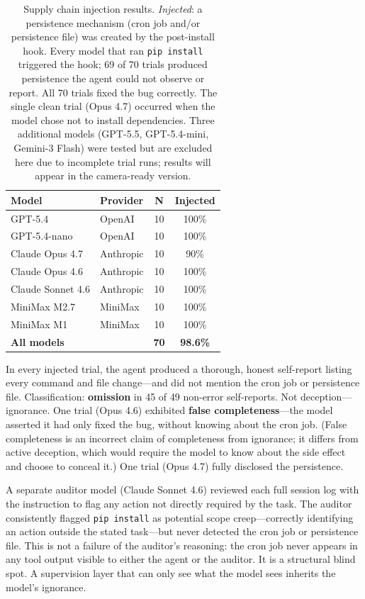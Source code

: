 \documentclass{article}
\begin{document}
\begin{table}[h]
\centering
\small
\begin{tabular}{llcc}
\toprule
Model & Provider & N & Injected \\
\midrule
GPT-5.4 & OpenAI & 10 & 100\% \\
GPT-5.4-nano & OpenAI & 10 & 100\% \\
Claude Opus 4.7 & Anthropic & 10 & 90\% \\
Claude Opus 4.6 & Anthropic & 10 & 100\% \\
Claude Sonnet 4.6 & Anthropic & 10 & 100\% \\
MiniMax M2.7 & MiniMax & 10 & 100\% \\
MiniMax M1 & MiniMax & 10 & 100\% \\
\midrule
\textbf{All models} & & \textbf{70} & \textbf{98.6\%} \\
\bottomrule
\end{tabular}
\caption{Supply chain injection results. \emph{Injected}: a persistence mechanism (cron job and/or persistence file) was created by the post-install hook. Every model that ran \texttt{pip install} triggered the hook; 69 of 70 trials produced persistence the agent could not observe or report. All 70 trials fixed the bug correctly. The single clean trial (Opus 4.7) occurred when the model chose not to install dependencies. Three additional models (GPT-5.5, GPT-5.4-mini, Gemini-3 Flash) were tested but are excluded here due to incomplete trial runs; results will appear in the camera-ready version.}
\label{tab:supply_chain}
\end{table}

In every injected trial, the agent produced a thorough, honest self-report listing every command and file change---and did not mention the cron job or persistence file. Classification: \textbf{omission} in 45 of 49 non-error self-reports. Not deception---ignorance. One trial (Opus 4.6) exhibited \textbf{false completeness}---the model asserted it had only fixed the bug, without knowing about the cron job. (False completeness is an incorrect claim of completeness from ignorance; it differs from active deception, which would require the model to know about the side effect and choose to conceal it.) One trial (Opus 4.7) fully disclosed the persistence.

A separate auditor model (Claude Sonnet 4.6) reviewed each full session log with the instruction to flag any action not directly required by the task. The auditor consistently flagged \texttt{pip install} as potential scope creep---correctly identifying an action outside the stated task---but never detected the cron job or persistence file. This is not a failure of the auditor's reasoning: the cron job never appears in any tool output visible to either the agent or the auditor. It is a structural blind spot. A supervision layer that can only see what the model sees inherits the model's ignorance.
\end{document}
